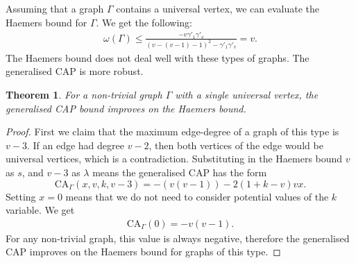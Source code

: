 \documentclass[11pt, baustms]{amsproc}
\theoremstyle{scplain}
\newtheorem{theorem}{Theorem}[section]
\newcommand\CA{\mathrm{CA}}
\renewcommand\le{\leqslant}
\begin{document}
Assuming that a graph $\Gamma$ contains a universal vertex, we can evaluate the Haemers bound for $\Gamma$. We get the following: 
\begin{align*} 
		\omega(\Gamma) \le \frac{-v \gamma'_1\gamma'_{v}}{(v-(v-1)-1)^2-\gamma'_1\gamma'_{v}} = v.
	\end{align*}
	The Haemers bound does not deal well with these types of graphs. The generalised CAP is more robust. 
 

    \begin{theorem}
	\label{nonreg_1}
	For a non-trivial graph $\Gamma$ with a single universal vertex, the generalised CAP bound improves on the Haemers bound.
	\end{theorem}

    
	\begin{proof}
	First we claim that the maximum edge-degree of a graph of this type is $v-3$. If an edge had degree $v-2$, then both vertices of the edge would be universal vertices, which is a contradiction. Substituting in the Haemers bound $v$ as $s$, and $v-3$ as $\lambda$ means the generalised CAP has the form $$\CA_\Gamma(x,v,k,v-3) = -(v(v-1))-2(1+k-v)vx. $$ Setting $x=0$ means that we do not need to consider potential values of the $k$ variable. We get \begin{align*} \CA_{\Gamma}(0)=  -v(v-1). \end{align*} For any non-trivial graph, this value is always negative, therefore the generalised CAP improves on the Haemers bound for graphs of this type.
	\end{proof}



\end{document}
